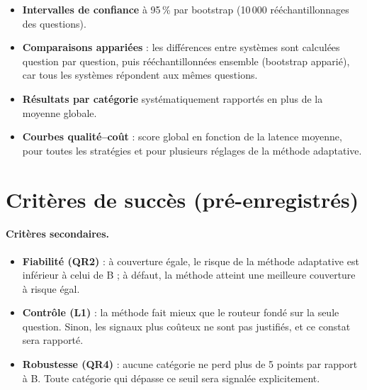 \documentclass[11pt,a4paper]{article}
\begin{document}
\begin{itemize}
\item \textbf{Intervalles de confiance} à 95\,\% par bootstrap (10\,000 rééchantillonnages des
questions).
\item \textbf{Comparaisons appariées} : les différences entre systèmes sont calculées question par
question, puis rééchantillonnées ensemble (bootstrap apparié), car tous les systèmes répondent aux
mêmes questions.
\item \textbf{Résultats par catégorie} systématiquement rapportés en plus de la moyenne globale.
\item \textbf{Courbes qualité--coût} : score global en fonction de la latence moyenne, pour toutes les
stratégies et pour plusieurs réglages de la méthode adaptative.
\end{itemize}

\section{Critères de succès (pré-enregistrés)}\label{sec:succes}

\begin{center}
\end{center}

\paragraph{Critères secondaires.}
\begin{itemize}
\item \textbf{Fiabilité (QR2)} : à couverture égale, le risque de la méthode adaptative est inférieur à
celui de B ; à défaut, la méthode atteint une meilleure couverture à risque égal.
\item \textbf{Contrôle (L1)} : la méthode fait mieux que le routeur fondé sur la seule question. Sinon,
les signaux plus coûteux ne sont pas justifiés, et ce constat sera rapporté.
\item \textbf{Robustesse (QR4)} : aucune catégorie ne perd plus de 5 points par rapport à B. Toute
catégorie qui dépasse ce seuil sera signalée explicitement.
\end{itemize}
\end{document}

